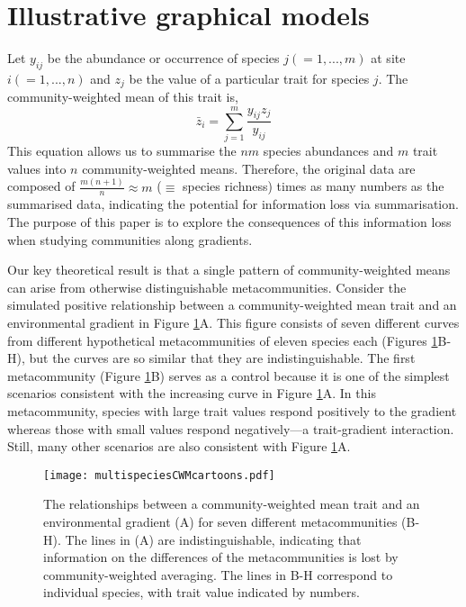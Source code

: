 \documentclass[12pt]{ecology}
\begin{document}
\section{Illustrative graphical models}

Let $y_{ij}$ be the abundance or occurrence of species $j (= 1, ..., m)$ at site $i (= 1, ..., n)$ and $z_j$ be the value of a particular trait for species $j$.  The community-weighted mean of this trait is,
\begin{equation} 
\bar{z}_i = \sum_{j=1}^m \frac{y_{ij} z_j}{y_{ij}}
\label{eq:cwmdef}
\end{equation}
This equation allows us to summarise the $nm$ species abundances and $m$ trait values into $n$ community-weighted means.  Therefore, the original data are composed of $\frac{m(n + 1)}{n} \approx m$ ($\equiv$ species richness) times as many numbers as the summarised data, indicating the potential for information loss via summarisation.  The purpose of this paper is to explore the consequences of this information loss when studying communities along gradients.

Our key theoretical result is that a single pattern of community-weighted means can arise from otherwise distinguishable metacommunities.  Consider the simulated positive relationship between a community-weighted mean trait and an environmental gradient in Figure \ref{fig:graphicalmodels}A.  This figure consists of seven different curves from different hypothetical metacommunities of eleven species each (Figures \ref{fig:graphicalmodels}B-H), but the curves are so similar that they are indistinguishable.  The first metacommunity (Figure \ref{fig:graphicalmodels}B) serves as a control because it is one of the simplest scenarios consistent with the increasing curve in Figure \ref{fig:graphicalmodels}A.  In this metacommunity, species with large trait values respond positively to the gradient whereas those with small values respond negatively---a trait-gradient interaction.  Still, many other scenarios are also consistent with Figure \ref{fig:graphicalmodels}A.

\begin{figure}

\texttt{[image: multispeciesCWMcartoons.pdf]}

\caption{The relationships between a community-weighted mean trait and an environmental gradient (A) for seven different metacommunities (B-H).  The lines in (A) are indistinguishable, indicating that information on the differences of the metacommunities is lost by community-weighted averaging.  The lines in B-H correspond to individual species, with trait value indicated by numbers.}
\label{fig:graphicalmodels}

\end{figure}
\end{document}

